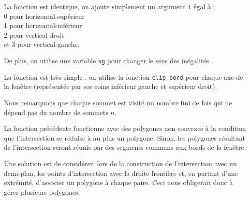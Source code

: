 \begin{center}
\end{center}



\Q
La fonction est identique, on ajoute simplement un argument \texttt{t} égal à :\\
0 pour horizontal-supérieur\\
1 pour horizontal-inférieur\\
2 pour vertical-droit\\
et 3 pour vertical-gauche.
\medskip

De plus, on utilise une variable \texttt{sg} pour changer le sens des inégalités.
\newpage



\Q
La fonction est très simple : on utilise la fonction \texttt{clip\_bord} pour chaque axe de la fenêtre (représentée par ses coins inférieur gauche et supérieur droit).



Nous remarquons que chaque sommet est visité un nombre fini de fois qui ne dépend pas du nombre de sommets $n$.

\Q
La fonction précédente fonctionne avec des polygones non convexes à la condition que l'intersection se réduise à au plus un polygone. Sinon, les polygones résultant de l'intersection seront réunis par des segments communs aux bords de la fenêtre.

\begin{center}
\end{center}

Une solution est de considérer, lors de la construction de l'intersection avec un demi-plan, les points d'intersection avec la droite frontière et, en partant d'une extrémité, d'associer un polygone à chaque paire. Ceci nous obligerait donc à gérer plusieurs polygones.
\bigskip

\Fin
